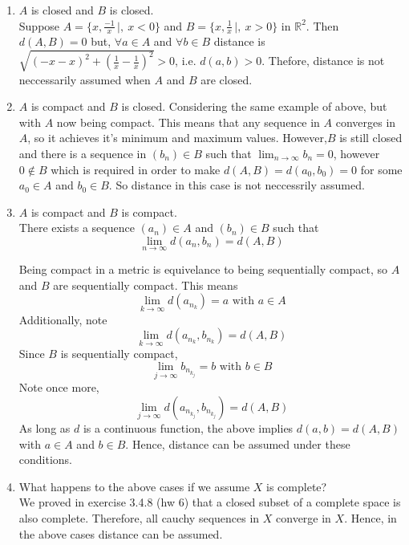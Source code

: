 \documentclass{tufte-book}
\theoremstyle{mytheoremstyle}
\theoremstyle{mylemstyle}
\theoremstyle{mydefstyle}
\begin{document}
\begin{enumerate}

\item $A$ is closed and $B$ is closed.\\
Suppose $A = \{x, \frac{-1}{x} \,|,\ x<0\}$ and $B = \{x, \frac{1}{x} \,|,\ x>0\}$ in $\mathbb{R}^2$.  Then $d(A,B)=0$ but, $\forall a \in A$ and $\forall b \in B$ distance is $\sqrt{(-x - x)^2 + (\frac{1}{x} - \frac{1}{x})^2}>0$, i.e. $d(a,b) > 0$.  Thefore, distance is not neccessarily assumed when $A$ and $B$ are closed.

\item $A$ is compact and $B$ is closed.
Considering the same example of above, but with $A$ now being compact.  This means that any sequence in $A$ converges in $A$, so it achieves it's minimum and maximum values.  However,$B$ is still closed and there is a sequence in $(b_n) \in B$ such that $\lim_{n \to \infty}b_n = 0$, however $0 \not\in B$ which is required in order to make $d(A,B) = d(a_0, b_0) = 0$ for some $a_0 \in A$ and $b_0 \in B$.  So distance in this case is not neccessrily assumed.

\item $A$ is compact and $B$ is compact.\\

There exists a sequence $(a_n) \in A$ and $(b_n) \in B$ such that
\[ \lim_{n \to \infty} d(a_n, b_n) = d(A,B) \]

Being compact in a metric is equivelance to being sequentially compact, so $A$ and $B$ are sequentially compact.  This means
\[ \lim_{k \to \infty} d(a_{n_k}) = a \text{ with } a \in A \]
Additionally, note
\[ \lim_{k \to \infty} d(a_{n_k}, b_{n_k}) = d(A,B) \]
Since $B$ is sequentially compact,
\[ \lim_{j \to \infty} b_{n_{k_j}} = b \text{ with } b \in B \]
Note once more,
\[ \lim_{j \to \infty} d(a_{n_{k_j}}, b_{n_{k_j}}) = d(A,B) \]
As long as $d$ is a continuous function, the above implies $d(a,b) = d(A,B)$ with $a \in A$ and $b \in B$.  Hence, distance can be assumed under these conditions.

\item What happens to the above cases if we assume $X$ is complete?\\
We proved in exercise 3.4.8 (hw 6) that a closed subset of a complete space is also complete. Therefore, all cauchy sequences in $X$ converge in $X$.  Hence, in the above cases distance can be assumed.

\end{enumerate}
\end{document}
